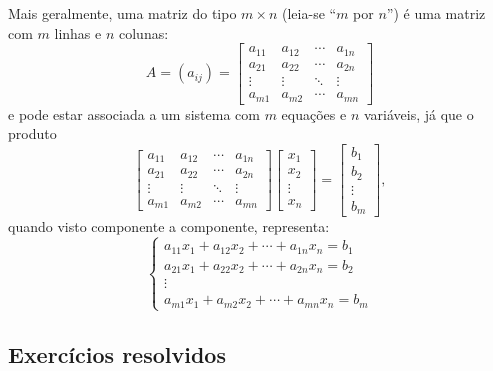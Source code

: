 Mais geralmente, uma matriz do tipo $m\times n$ (leia-se ``$m$ por $n$'') é uma matriz com $m$ linhas e $n$ colunas:
\begin{equation}
A = \left(a_{ij}\right) =
\begin{bmatrix}
a_{11}&a_{12}&\cdots &a_{1n}\\
a_{21}&a_{22}&\cdots &a_{2n}\\
\vdots &\vdots &\ddots &\vdots \\
a_{m1}&a_{m2}&\cdots &a_{mn}
\end{bmatrix}
\end{equation} e pode estar associada a um sistema com $m$ equações e $n$ variáveis, já que o produto
\begin{equation}
\left[
  \begin{array}{cccc}
  a_{11}&a_{12}&\cdots &a_{1n}\\
  a_{21}&a_{22}&\cdots &a_{2n}\\
  \vdots &\vdots &\ddots &\vdots \\
  a_{m1}&a_{m2}&\cdots &a_{mn}
\end{array}
\right]
\left[
  \begin{array}{c}
    x_1 \\
    x_2 \\
    \vdots \\
    x_n
  \end{array}
\right] =
\left[
  \begin{array}{c}
    b_1 \\
    b_2 \\
    \vdots \\
    b_m
  \end{array}
\right],
\end{equation} quando visto componente a componente, representa:
\begin{equation}
\left\{
  \begin{array}{cc}
  a_{11} x_1 + a_{12} x_2 + \cdots + a_{1n} x_n =  b_1 \\
  a_{21} x_1 + a_{22} x_2 + \cdots + a_{2n} x_n =  b_2 \\
    \vdots \\
  a_{m1} x_1 + a_{m2} x_2 + \cdots + a_{mn} x_n =  b_m 
\end{array}
\right.
\end{equation}


\subsection*{Exercícios resolvidos}

